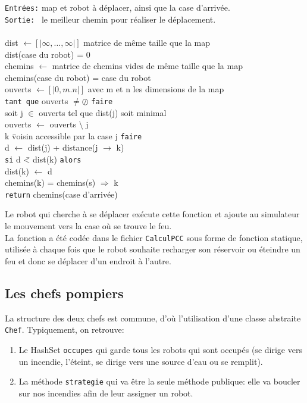 \documentclass[a4paper,10pt]{article} %
\begin{document}
\begin{tabbing}
{\tt Entrées:} map et robot à déplacer, ainsi que la case d'arrivée.\\
{\tt Sortie: } le meilleur chemin pour réaliser le déplacement. \\ \\
dist \(\leftarrow [|\infty,\ldots ,\infty|]\)          matrice de même taille que la map \\
dist(case du robot) = 0\\
chemins \(\leftarrow \)          matrice de chemins vides de même taille que la map\\
chemins(case du robot) = case du robot \\
ouverts \(\leftarrow [|0,m.n|]\)          avec m et n les dimensions de la map\\
{\tt tant que} ouverts \(\neq \oslash \) {\tt faire}\\
\quad soit j \(\in \) ouverts tel que dist(j) soit minimal\\
\quad ouverts \(\leftarrow \) ouverts \(\setminus \) {j}\\
 k \= voisin accessible par la case j {\tt faire} \\
\quad \> d \(\leftarrow \) dist(j) + distance(j \(\rightarrow \) k)\\
\quad \> {\tt si} d \=< dist(k) {\tt alors} \\
\quad \> \> dist(k) \(\leftarrow \) d\\
\quad \> \> chemins(k) = chemins(s) \(\Rightarrow \) k\\
{\tt return} chemins(case d'arrivée)
\end{tabbing}

Le robot qui cherche à se déplacer exécute cette fonction et ajoute au simulateur le mouvement vers la case où se trouve le feu. \\
La fonction a été codée dans le fichier {\tt CalculPCC} sous forme de fonction statique, utilisée à chaque fois que le robot souhaite
recharger son réservoir ou éteindre un feu et donc se déplacer d'un endroit à l'autre.

\subsection{Les chefs pompiers}
La structure des deux chefs est commune, d'où l'utilisation d'une classe abstraite \texttt{Chef}. Typiquement, on retrouve:
\begin{enumerate}
    \item Le HashSet \texttt{occupes} qui garde tous les robots qui sont occupés (se dirige vers un incendie, l'éteint,
    se dirige vers une source d'eau ou se remplit).
    \item La méthode \texttt{strategie} qui va être la seule méthode publique: elle va boucler sur nos incendies afin de leur assigner un robot.
\end{enumerate}
\end{document}
